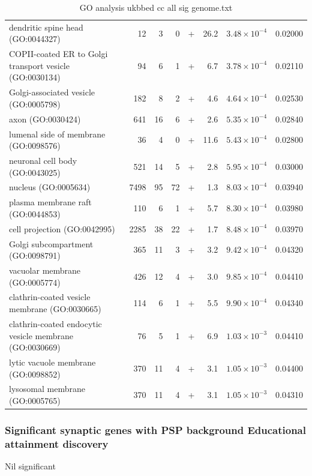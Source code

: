 \begin{table}[ht]
\begin{adjustbox}{width=\textwidth}
\begin{tabular}{lrrrlrrr}
  dendritic spine head (GO:0044327) & 12 & 3 & 0 & + & 26.2 & $3.48 \times 10^{-4}$ & 0.02000 \\ 
  COPII-coated ER to Golgi transport vesicle (GO:0030134) & 94 & 6 & 1 & + & 6.7 & $3.78 \times 10^{-4}$ & 0.02110 \\ 
  Golgi-associated vesicle (GO:0005798) & 182 & 8 & 2 & + & 4.6 & $4.64 \times 10^{-4}$ & 0.02530 \\ 
  axon (GO:0030424) & 641 & 16 & 6 & + & 2.6 & $5.35 \times 10^{-4}$ & 0.02840 \\ 
  lumenal side of membrane (GO:0098576) & 36 & 4 & 0 & + & 11.6 & $5.43 \times 10^{-4}$ & 0.02800 \\ 
  neuronal cell body (GO:0043025) & 521 & 14 & 5 & + & 2.8 & $5.95 \times 10^{-4}$ & 0.03000 \\ 
  nucleus (GO:0005634) & 7498 & 95 & 72 & + & 1.3 & $8.03 \times 10^{-4}$ & 0.03940 \\ 
  plasma membrane raft (GO:0044853) & 110 & 6 & 1 & + & 5.7 & $8.30 \times 10^{-4}$ & 0.03980 \\ 
  cell projection (GO:0042995) & 2285 & 38 & 22 & + & 1.7 & $8.48 \times 10^{-4}$ & 0.03970 \\ 
  Golgi subcompartment (GO:0098791) & 365 & 11 & 3 & + & 3.2 & $9.42 \times 10^{-4}$ & 0.04320 \\ 
  vacuolar membrane (GO:0005774) & 426 & 12 & 4 & + & 3.0 & $9.85 \times 10^{-4}$ & 0.04410 \\ 
  clathrin-coated vesicle membrane (GO:0030665) & 114 & 6 & 1 & + & 5.5 & $9.90 \times 10^{-4}$ & 0.04340 \\ 
  clathrin-coated endocytic vesicle membrane (GO:0030669) & 76 & 5 & 1 & + & 6.9 & $1.03 \times 10^{-3}$ & 0.04410 \\ 
  lytic vacuole membrane (GO:0098852) & 370 & 11 & 4 & + & 3.1 & $1.05 \times 10^{-3}$ & 0.04400 \\ 
  lysosomal membrane (GO:0005765) & 370 & 11 & 4 & + & 3.1 & $1.05 \times 10^{-3}$ & 0.04310 \\ 
   \hline
\end{tabular}
\end{adjustbox}
\caption{GO analysis ukbbed  cc  all  sig  genome.txt} 
\label{tab:GO analysis ukbbed cc all sig genome.txt}
\end{table}
\subsubsection{Significant synaptic genes with PSP background Educational attainment discovery}
Nil significant





